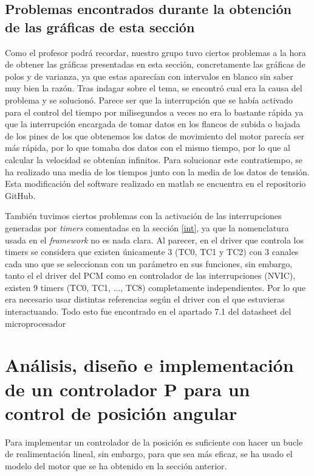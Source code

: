 \documentclass[a4paper]{article}
\begin{document}
\subsection{Problemas encontrados durante la obtención de las gráficas de esta sección}
Como el profesor podrá recordar, nuestro grupo tuvo ciertos problemas a la hora de obtener las gráficas presentadas en esta sección, concretamente las gráficas de polos y de varianza,
ya que estas aparecían con intervalos en blanco sin saber muy bien la razón. Tras indagar sobre el tema, se encontró cual era la causa
del problema y se solucionó. Parece ser que la interrupción que se había activado para el control del tiempo por milisegundos a veces
no era lo bastante rápida ya que la interrupción encargada de tomar datos en los flancos de subida o bajada de los pines de los que obtenemos
los datos de movimiento del motor parecía ser más rápida, por lo que tomaba dos datos con el mismo tiempo, por lo que al calcular la velocidad se obtenían infinitos.
Para solucionar este contratiempo, se ha realizado una media de los tiempos junto con la media de los datos de tensión.
Esta modificación del software realizado en matlab se encuentra en el repositorio GitHub.

También tuvimos ciertos problemas con la activación de las interrupciones generadas por \emph{timers} comentadas en la sección \ref{int}, ya que la nomenclatura usada en el \emph{framework} no es nada clara.
Al parecer, en el driver que controla los timers se considera que existen únicamente 3 (TC0, TC1 y TC2) con 3 canales cada uno que se seleccionan con un parámetro en sus funciones,
sin embargo, tanto el el driver del PCM como en controlador de las interrupciones (NVIC), existen 9 timers (TC0, TC1, ..., TC8) completamente independientes. Por lo que era necesario
usar distintas referencias según el driver con el que estuvieras interactuando. Todo esto fue encontrado en el apartado 7.1 del datasheet del microprocesador \cite{SAM3X/A}

\section{Análisis, diseño e implementación de un controlador P para un control de posición angular \label{control}}

Para implementar un controlador de la posición es suficiente con hacer un bucle de realimentación lineal,
sin embargo, para que sea más eficaz, se ha usado el modelo del motor que se ha obtenido en la sección anterior.
\end{document}
